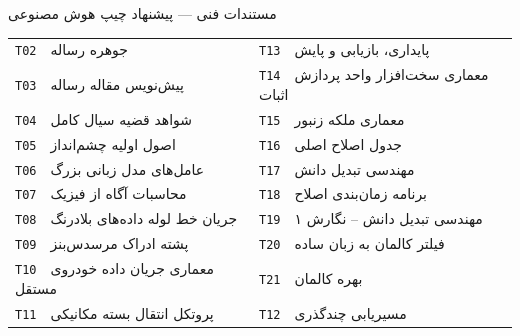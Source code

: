 \documentclass[10pt]{report}
\newcommand{\codeentry}[2]{\texttt{#1}~~#2}
\begin{document}
\begin{mainbox}{مستندات فنی — پیشنهاد چیپ هوش مصنوعی}
\vspace{0.8em}

\begin{center}
\begin{minipage}{0.95\textwidth}
\renewcommand{\arraystretch}{1.4}
\begin{tabular}{|>{\raggedleft}P{0.45\textwidth}|>{\raggedleft}P{0.45\textwidth}|}
\hline
{}
 \\
\hline
{}
\codeentry{T02}{جوهره رساله} & \codeentry{T13}{پایداری، بازیابی و پایش} \\
\hline
{}
\codeentry{T03}{پیش‌نویس مقاله رساله} & \codeentry{T14}{معماری سخت‌افزار واحد پردازش اثبات} \\
\hline
{}
\codeentry{T04}{شواهد قضیه سیال کامل} & \codeentry{T15}{معماری ملکه زنبور} \\
\hline
{}
\codeentry{T05}{اصول اولیه چشم‌انداز} & \codeentry{T16}{جدول اصلاح اصلی} \\
\hline
{}
\codeentry{T06}{عامل‌های مدل زبانی بزرگ} & \codeentry{T17}{مهندسی تبدیل دانش} \\
\hline
{}
\codeentry{T07}{محاسبات آگاه از فیزیک} & \codeentry{T18}{برنامه زمان‌بندی اصلاح} \\
\hline
{}
\codeentry{T08}{جریان خط لوله داده‌های بلادرنگ} & \codeentry{T19}{مهندسی تبدیل دانش – نگارش ۱} \\
\hline
{}
\codeentry{T09}{پشته ادراک مرسدس‌بنز} & \codeentry{T20}{فیلتر کالمان به زبان ساده} \\
\hline
{}
\codeentry{T10}{معماری جریان داده خودروی مستقل} & \codeentry{T21}{بهره کالمان} \\
\hline
{}
\codeentry{T11}{پروتکل انتقال بسته مکانیکی} & \codeentry{T12}{مسیریابی چندگذری} \\
\hline
\end{tabular}
\end{minipage}
\end{center}
\end{mainbox}
\end{document}
